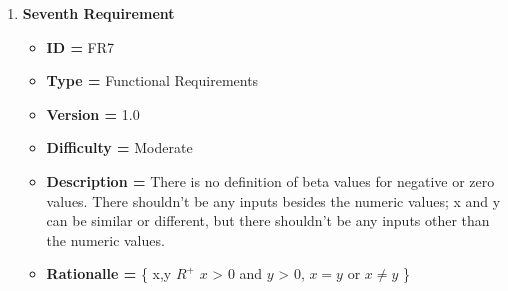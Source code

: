 \documentclass[a4paper, 12pt]{article}
\begin{document}
\begin{enumerate}[noitemsep]
        \item \textbf{Seventh Requirement}
        \begin{itemize}
            \item \textbf{ID = } FR7
            \item\textbf{Type = } Functional Requirements
            \item\textbf{Version = } 1.0
            \item\textbf{Difficulty = } Moderate
            \item\textbf{Description = } There is no definition of beta values for negative or zero values. There shouldn't be any inputs besides the numeric values; x and y can be similar or different, but there shouldn't be any inputs other than the numeric values.
            \item\textbf{Rationalle = } \{ \forall x,y \in $R^{+}$ \mid\; $x$ > $0$\; and \;$y$ > $0$, $ x = y $ or $ x \neq y $ \}
        \end{itemize}
        \newpage
    \end{enumerate}
\end{document}
